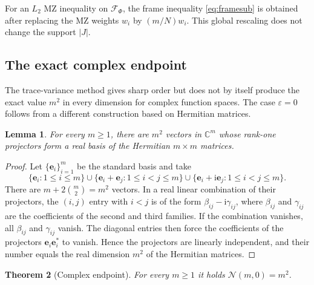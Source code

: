 \documentclass[a4paper]{amsart}
\numberwithin{equation}{section}
\newtheorem{theorem}{Theorem}[section]
\newtheorem{lemma}[theorem]{Lemma}
\begin{document}
For an $L_2$ MZ inequality on $\mathcal F_\Phi$, the frame inequality \eqref{eq:framesub} is obtained after replacing the MZ weights $w_i$ by $(m/N)w_i$.
This global rescaling does not change the support $|J|$.



\subsection{The exact complex endpoint}

The trace-variance method gives sharp order but does not by itself produce the exact value $m^2$ in every dimension for complex function spaces.
The case $\varepsilon=0$ follows from a different construction based on Hermitian matrices.

\begin{lemma}\label{lem:hermitian-projector-basis}
    For every $m\geq1$, there are $m^2$ vectors in $\mathds C^m$ whose rank-one projectors form a real basis of the Hermitian $m\times m$ matrices.
\end{lemma}

\begin{proof}
    Let $\{\bm e_i\}_{i=1}^m$ be the standard basis and take
    \begin{equation}\label{eq:exact-vectors}
        \{\bm e_i:1\leq i\leq m\}
        \cup
        \{\bm e_i+\bm e_j:1\leq i<j\leq m\}
        \cup
        \{\bm e_i+\mathrm i\bm e_j:1\leq i<j\leq m\}.
    \end{equation}
    There are $m+2\binom m2=m^2$ vectors.
    In a real linear combination of their projectors, the $(i,j)$ entry with $i<j$ is of the form $\beta_{ij}-\mathrm i\gamma_{ij}$, where $\beta_{ij}$ and $\gamma_{ij}$ are the coefficients of the second and third families.
    If the combination vanishes, all $\beta_{ij}$ and $\gamma_{ij}$ vanish.
    The diagonal entries then force the coefficients of the projectors $\bm e_i\bm e_i^*$ to vanish.
    Hence the projectors are linearly independent, and their number equals the real dimension $m^2$ of the Hermitian matrices.
\end{proof}

\begin{theorem}[Complex endpoint]\label{thm:exact-endpoint}
    For every $m\geq1$ it holds $\mathcal N(m,0)=m^2$.
\end{theorem}
\end{document}
